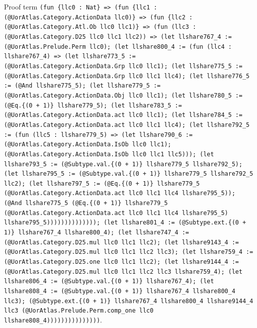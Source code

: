 \documentclass[11pt]{article}
\begin{document}
\noindent Proof term \texttt{(fun \{llc0 : Nat\} => (fun \{llc1 : (@UorAtlas.Category.ActionData llc0)\} => (fun \{llc2 : (@UorAtlas.Category.Atl.Ob llc0 llc1)\} => (fun (llc3 : (@UorAtlas.Category.D25 llc0 llc1 llc2)) => (let llshare767\_4 := (@UorAtlas.Prelude.Perm llc0); (let llshare800\_4 := (fun (llc4 : llshare767\_4) => (let llshare773\_5 := (@UorAtlas.Category.ActionData.Grp llc0 llc1); (let llshare775\_5 := (@UorAtlas.Category.ActionData.Grp llc0 llc1 llc4); (let llshare776\_5 := (@And llshare775\_5); (let llshare779\_5 := (@UorAtlas.Category.ActionData.Obj llc0 llc1); (let llshare780\_5 := (@Eq.\{(0 + 1)\} llshare779\_5); (let llshare783\_5 := (@UorAtlas.Category.ActionData.act llc0 llc1); (let llshare784\_5 := (@UorAtlas.Category.ActionData.act llc0 llc1 llc4); (let llshare792\_5 := (fun (llc5 : llshare779\_5) => (let llshare790\_6 := (@UorAtlas.Category.ActionData.IsOb llc0 llc1); (@UorAtlas.Category.ActionData.IsOb llc0 llc1 llc5))); (let llshare793\_5 := (@Subtype.val.\{(0 + 1)\} llshare779\_5 llshare792\_5); (let llshare795\_5 := (@Subtype.val.\{(0 + 1)\} llshare779\_5 llshare792\_5 llc2); (let llshare797\_5 := (@Eq.\{(0 + 1)\} llshare779\_5 (@UorAtlas.Category.ActionData.act llc0 llc1 llc4 llshare795\_5)); (@And llshare775\_5 (@Eq.\{(0 + 1)\} llshare779\_5 (@UorAtlas.Category.ActionData.act llc0 llc1 llc4 llshare795\_5) llshare795\_5)))))))))))))); (let llshare801\_4 := (@Subtype.ext.\{(0 + 1)\} llshare767\_4 llshare800\_4); (let llshare747\_4 := (@UorAtlas.Category.D25.mul llc0 llc1 llc2); (let llshare9143\_4 := (@UorAtlas.Category.D25.mul llc0 llc1 llc2 llc3); (let llshare759\_4 := (@UorAtlas.Category.D25.one llc0 llc1 llc2); (let llshare9144\_4 := (@UorAtlas.Category.D25.mul llc0 llc1 llc2 llc3 llshare759\_4); (let llshare806\_4 := (@Subtype.val.\{(0 + 1)\} llshare767\_4); (let llshare808\_4 := (@Subtype.val.\{(0 + 1)\} llshare767\_4 llshare800\_4 llc3); (@Subtype.ext.\{(0 + 1)\} llshare767\_4 llshare800\_4 llshare9144\_4 llc3 (@UorAtlas.Prelude.Perm.comp\_one llc0 llshare808\_4)))))))))))))))}.\par
\end{document}
